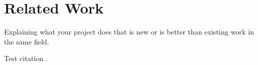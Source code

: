 \chapter{Related Work}

Explaining what your project does that is new or is better than existing work in the same field.

Test citation \cite{cormen2009introduction}.
